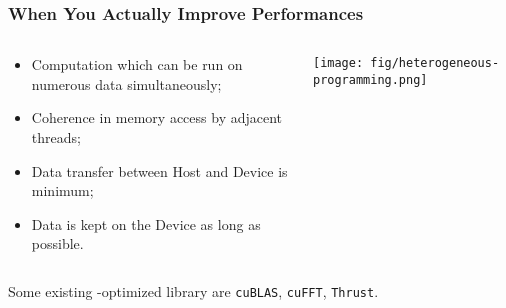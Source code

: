 \begin{frame}[fragile]
	\frametitle{When You Actually Improve Performances}
	\begin{columns}
		\begin{column}{.55\columnwidth}
			\begin{itemize}
				\item Computation which can be run on numerous data simultaneously;
				\item Coherence in memory access by adjacent threads;
				\item Data transfer between Host and Device is minimum;
				\item Data is kept on the Device as long as possible.
			\end{itemize}
		\end{column}%

		\begin{column}{.45\columnwidth}
			\texttt{[image: fig/heterogeneous-programming.png]}
		\end{column}%
	\end{columns}
	Some existing \gpu-optimized library are \verb!cuBLAS!, \verb!cuFFT!, \verb!Thrust!.
\end{frame}

